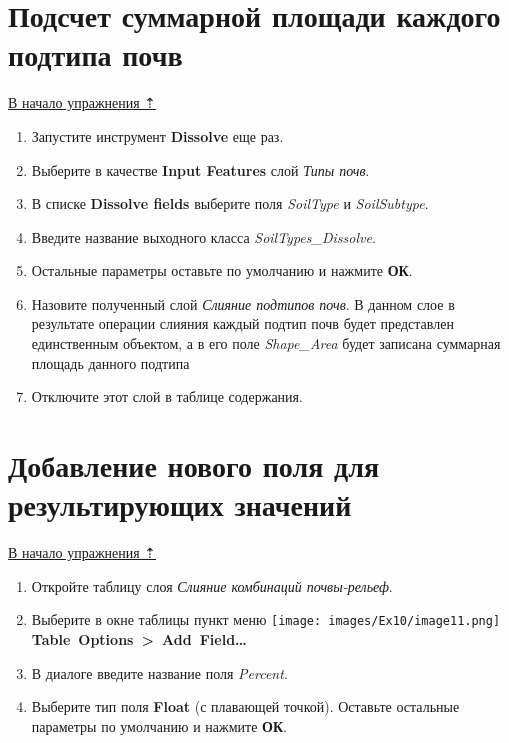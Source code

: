 \documentclass[12pt,]{book}
\begin{document}
\hypertarget{overlay-sumarea-subtypes}{%
\section{Подсчет суммарной площади каждого подтипа почв}\label{overlay-sumarea-subtypes}}

\protect\hyperlink{overlay}{В начало упражнения ⇡}

\begin{enumerate}
\def\labelenumi{\arabic{enumi}.}
\item
  Запустите инструмент \textbf{Dissolve} еще раз.
\item
  Выберите в качестве \textbf{Input Features} слой \emph{Типы почв}.
\item
  В списке \textbf{Dissolve fields} выберите поля \emph{SoilType} и \emph{SoilSubtype}.
\item
  Введите название выходного класса \emph{SoilTypes\_Dissolve}.
\item
  Остальные параметры оставьте по умолчанию и нажмите \textbf{ОК}.
\item
  Назовите полученный слой \emph{Слияние подтипов почв}. В данном слое в результате операции слияния каждый подтип почв будет представлен единственным объектом, а в его поле \emph{Shape\_Area} будет записана суммарная площадь данного подтипа
\item
  Отключите этот слой в таблице содержания.
\end{enumerate}

\hypertarget{overlay-field}{%
\section{Добавление нового поля для результирующих значений}\label{overlay-field}}

\protect\hyperlink{overlay}{В начало упражнения ⇡}

\begin{enumerate}
\def\labelenumi{\arabic{enumi}.}
\item
  Откройте таблицу слоя \emph{Слияние комбинаций почвы-рельеф}.
\item
  Выберите в окне таблицы пункт меню \texttt{[image: images/Ex10/image11.png]} \textbf{Table~Options~\textgreater{}~Add~Field\ldots{}}
\item
  В диалоге введите название поля \emph{Percent}.
\item
  Выберите тип поля \textbf{Float} (с плавающей точкой). Оставьте остальные параметры по умолчанию и нажмите \textbf{ОК}.
\end{enumerate}
\end{document}
